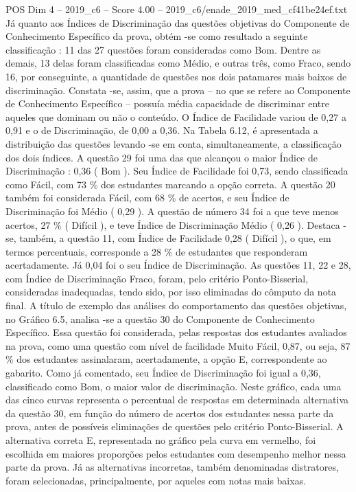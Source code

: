 \begin{textsample}{POS Dim 4 – 2019\_c6 – Score 4.00 – 2019\_c6/enade\_2019\_med\_cf41be24ef.txt}
Já quanto aos Índices de Discriminação das questões objetivas do Componente de Conhecimento Específico da prova, obtém -se como resultado a seguinte classificação : 11 das 27 questões foram consideradas como Bom.
Dentre as demais, 13 delas foram classificadas como Médio, e outras três, como Fraco, sendo 16, por conseguinte, a quantidade de questões nos dois patamares mais baixos de discriminação.
Constata -se, assim, que a prova – no que se refere ao Componente de Conhecimento Específico – possuía média capacidade de discriminar entre aqueles que dominam ou não o conteúdo.
O Índice de Facilidade variou de 0,27 a 0,91 e o de Discriminação, de 0,00 a 0,36.
Na Tabela 6.12, é apresentada a distribuição das questões levando -se em conta, simultaneamente, a classificação dos dois índices.
A questão 29 foi uma das que alcançou o maior Índice de Discriminação : 0,36 ( Bom ).
Seu Índice de Facilidade foi 0,73, sendo classificada como Fácil, com 73 \% dos estudantes marcando a opção correta.
A questão 20 também foi considerada Fácil, com 68 \% de acertos, e seu Índice de Discriminação foi Médio ( 0,29 ).
A questão de número 34 foi a que teve menos acertos, 27 \% ( Difícil ), e teve Índice de Discriminação Médio ( 0,26 ).
Destaca -se, também, a questão 11, com Índice de Facilidade 0,28 ( Difícil ), o que, em termos percentuais, corresponde a 28 \% de estudantes que responderam acertadamente.
Já 0,04 foi o seu Índice de Discriminação.
As questões 11, 22 e 28, com Índice de Discriminação Fraco, foram, pelo critério Ponto-Bisserial, consideradas inadequadas, tendo sido, por isso eliminadas do cômputo da nota final.
A título de exemplo das análises do comportamento das questões objetivas, no Gráfico 6.5, analisa -se a questão 30 do Componente de Conhecimento Específico.
Essa questão foi considerada, pelas respostas dos estudantes avaliados na prova, como uma questão com nível de facilidade Muito Fácil, 0,87, ou seja, 87 \% dos estudantes assinalaram, acertadamente, a opção E, correspondente ao gabarito.
Como já comentado, seu Índice de Discriminação foi igual a 0,36, classificado como Bom, o maior valor de discriminação.
Neste gráfico, cada uma das cinco curvas representa o percentual de respostas em determinada alternativa da questão 30, em função do número de acertos dos estudantes nessa parte da prova, antes de possíveis eliminações de questões pelo critério Ponto-Bisserial.
A alternativa correta E, representada no gráfico pela curva em vermelho, foi escolhida em maiores proporções pelos estudantes com desempenho melhor nessa parte da prova.
Já as alternativas incorretas, também denominadas distratores, foram selecionadas, principalmente, por aqueles com notas mais baixas.

\end{textsample}
